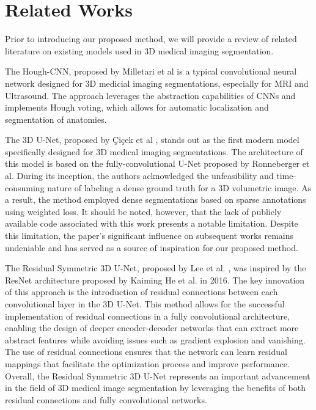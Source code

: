 \section{Related Works}
Prior to introducing our proposed method, we will provide a review of related literature on existing models used in 3D medical imaging segmentation.

The Hough-CNN, proposed by Milletari et al \cite{28} is a typical convolutional neural network designed for 3D medicial imaging segmentations, especially for MRI and Ultrasound. The approach leverages the abstraction capabilities of CNNs and implements Hough voting, which allows for automatic localization and segmentation of anatomies. 

The 3D U-Net, proposed by Çiçek et al \cite{13}, stands out as the first modern model specifically designed for 3D medical imaging segmentations. The architecture of this model is based on the fully-convolutional U-Net proposed by Ronneberger et al. During its inception, the authors acknowledged the unfeasibility and time-consuming nature of labeling a dense ground truth for a 3D volumetric image. As a result, the method employed dense segmentations based on sparse annotations using weighted loss. It should be noted, however, that the lack of publicly available code associated with this work presents a notable limitation. Despite this limitation, the paper's significant influence on subsequent works remains undeniable and has served as a source of inspiration for our proposed method.

The Residual Symmetric 3D U-Net, proposed by Lee et al. \cite{29}, was inspired by the ResNet architecture proposed by Kaiming He et al. \cite{6} in 2016. The key innovation of this approach is the introduction of residual connections between each convolutional layer in the 3D U-Net. This method allows for the successful implementation of residual connections in a fully convolutional architecture, enabling the design of deeper encoder-decoder networks that can extract more abstract features while avoiding issues such as gradient explosion and vanishing. The use of residual connections ensures that the network can learn residual mappings that facilitate the optimization process and improve performance. Overall, the Residual Symmetric 3D U-Net represents an important advancement in the field of 3D medical image segmentation by leveraging the benefits of both residual connections and fully convolutional networks.

